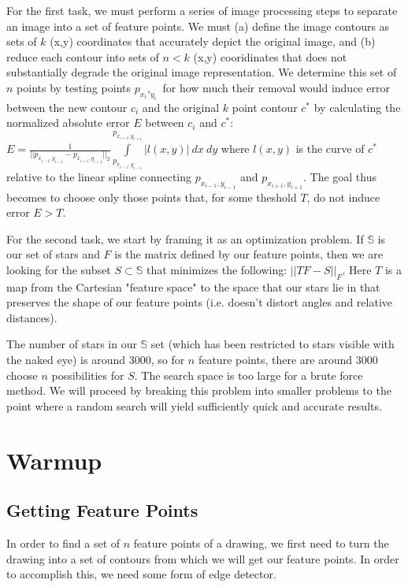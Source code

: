 \documentclass[paper=a4, fontsize=11pt]{scrartcl} %
\begin{document}
For the first task, we must perform a series of image processing steps to separate an image into a set of feature points. We must (a) define the image contours as sets of $k$ (x,y) coordinates that accurately depict the original image, and (b) reduce each contour into sets of $n<k$ (x,y) cooridinates that does not substantially degrade the original image representation. We determine this set of $n$ points by testing points $p_{x_i},_{y_i}$ for how much their removal would induce error between the new contour $c_i$ and the original $k$ point contour $c^*$ by calculating the normalized absolute error $E$ between $c_i$ and $c^*$: $E = \frac{1}{|| p_{x_{i-1},y_{i-1}}  -  p_{x_{i+1},y_{i+1}} ||_2} \int\limits_{p_{x_{i-1},y_{i-1}}}^{p_{x_{i+1},y_{i+1}}} |l(x,y)| \ dx \ dy$ where $l(x,y)$ is the curve of $c^*$ relative to the linear spline connecting $p_{x_{i-1},y_{i-1}}$ and $p_{x_{i+1},y_{i+1}}$. The goal thus becomes to choose only those points that, for some theshold $T$, do not induce error $E > T$. 

For the second task, we start by framing it as an optimization problem. If $\mathbb{S}$ is our set of stars and $F$ is the matrix defined by our feature points, then we are looking for the subset $S\subset\mathbb{S}$ that minimizes the following: $||TF - S||_F$.  Here $T$ is a map from the Cartesian "feature space" to the space that our stars lie in that preserves the shape of our feature points (i.e. doesn't distort angles and relative distances).

The number of stars in our $\mathbb{S}$ set (which has been restricted to stars visible with the naked eye) is around 3000, so for $n$ feature points, there are around 3000 choose $n$ possibilities for $S$. The search space is too large for a brute force method.  We will proceed by breaking this problem into smaller problems to the point where a random search will yield sufficiently quick and accurate results.
\section{Warmup}

\subsection{Getting Feature Points}

In order to find a set of $n$ feature points of a drawing, we first need to turn the drawing into a set of contours from which we will get our feature points. In order to accomplish this, we need some form of edge detector. 
\end{document}
